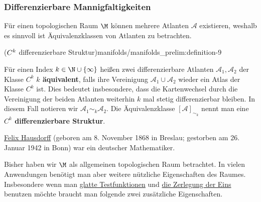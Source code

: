 \documentclass[letterpaper,10pt,english]{jupyterBook}
\begin{document}
\subsubsection{Differenzierbare Mannigfaltigkeiten}
\label{\detokenize{manifolds/manifolds_prelim:differenzierbare-mannigfaltigkeiten}}
\par
Für einen topologischen Raum \(\M\) können mehrere Atlanten \(\mathcal{A}\) existieren, weshalb es sinnvoll ist Äquivalenzklassen von Atlanten zu betrachten.
\begin{definition}{(\protect\(C^k\protect\) differenzierbare Struktur)}{manifolds/manifolds_prelim:definition-9}



\par
Für einen Index \(k\in \N \cup \{\infty\}\) heißen zwei differenzierbare Atlanten \(\mathcal{A}_1, \mathcal{A}_2\) der Klasse \(C^k\) \textbf{\(k\) äquivalent}, falls ihre Vereinigung \(\mathcal{A}_1\cup \mathcal{A}_2\) wieder ein Atlas der Klasse \(C^k\) ist.
Dies bedeutet insbesondere, dass die Kartenwechsel durch die Vereinigung der beiden Atlanten weiterhin \(k\) mal stetig differenzierbar bleiben.
In diesem Fall notieren wir \(\mathcal{A}_1\sim_k \mathcal{A}_2\).
Die Äquivalenzklasse \([\mathcal{A}]_{\sim_k}\) nennt man eine \textbf{\(C^k\) differenzierbare Struktur}.
\end{definition}

\begin{emphBox}{}{}

\par
\href{https://de.wikipedia.org/wiki/Felix\_Hausdorff}{Felix Hausdorff} (geboren am 8. November 1868 in Breslau; gestorben am 26. Januar 1942 in Bonn) war ein deutscher Mathematiker.
\end{emphBox}

\par
Bisher haben wir \(\M\) als allgemeinen topologischen Raum betrachtet.
In vielen Anwendungen benötigt man aber weitere nützliche Eigenschaften des Raumes.
Insbesondere wenn man \href{https://de.wikipedia.org/wiki/Testfunktion}{glatte Testfunktionen} und \href{https://en.wikipedia.org/wiki/Partition\_of\_unity}{die Zerlegung der Eins} benutzen möchte braucht man folgende zwei zusätzliche Eigenschaften.
\end{document}

